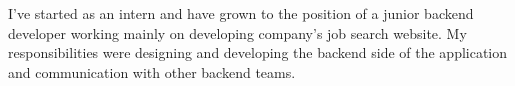 I’ve started as an intern and have grown to the position of a junior backend 
developer working mainly on developing company’s job search website. 
My responsibilities were designing and developing the backend side of the application 
and communication with other backend teams.
